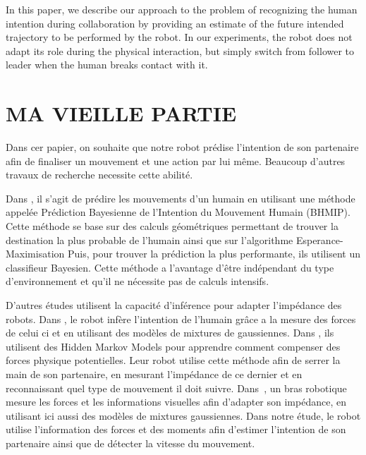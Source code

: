 \documentclass[utf8]{frontiersSCNS} %
\newcommand{\todo}[1]{\textcolor{red}{\textbf{/*#1*/}}}
\begin{document}

In this paper, we describe our approach to the problem of recognizing the human intention during collaboration by providing an estimate of the future intended trajectory to be performed by the robot. In our experiments, the robot does not adapt its role during the physical interaction, but simply switch from follower to leader when the human breaks contact with it. 

\section{MA VIEILLE PARTIE}

Dans cer papier, on souhaite que notre robot prédise l'intention de son partenaire afin de finaliser un mouvement et une action par lui même. Beaucoup d'autres travaux de recherche necessite cette abilité.


Dans \cite{ferrer2014bayesian}, il s'agit de prédire les mouvements d'un humain en utilisant une méthode appelée Prédiction Bayesienne de l'Intention du Mouvement Humain (BHMIP).
Cette méthode se base sur des calculs géométriques permettant de trouver la destination la plus probable de l'humain ainsi que sur l'algorithme Esperance-Maximisation 
Puis, pour trouver la prédiction la plus performante, ils utilisent un classifieur Bayesien. Cette méthode a l'avantage d'être indépendant du type d'environnement et qu'il ne nécessite pas de calculs intensifs.

D'autres études utilisent la capacité d'inférence pour adapter l'impédance des robots.
Dans \citep{gribovskaya2011motion}, le robot infère l'intention de l'humain grâce a la mesure des forces de celui ci et en utilisant des modèles de mixtures de gaussiennes. Dans \citep{wang2009hmm}, ils utilisent des Hidden Markov Models pour apprendre comment compenser des forces physique potentielles. Leur robot utilise cette méthode afin de serrer la main de son partenaire, en mesurant l'impédance de ce dernier et en reconnaissant quel type de mouvement il doit suivre. Dans~\citep{rozo2013learning}, un bras robotique mesure les forces et les informations visuelles afin d'adapter son impédance, en utilisant ici aussi des modèles de mixtures gaussiennes.
Dans notre étude, le robot utilise l'information des forces et des moments afin d'estimer l’intention de son partenaire ainsi que de détecter la vitesse du mouvement.
\end{document}
